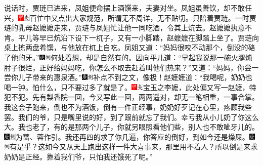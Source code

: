 {{{{{说话时，贾琏已进来，凤姐便命摆上酒馔来，夫妻对坐。凤姐虽善饮，却不敢任兴，{\includegraphics[width=3mm]{../Images/00002}\includegraphics[width=3mm]{../Images/00012}\footnotesize \kaishu 百忙中又点出大家规范，所谓无不周详，无不贴切。}只陪着贾琏。一时贾琏的乳母赵嬷嬷走来，贾琏与凤姐忙让他一同吃酒，令其上炕去。赵嬷嬷执意不肯。平儿等早已炕沿下设下一杌子，又有一小脚踏，赵嬷嬷在脚踏上坐了。贾琏向桌上拣两盘肴馔，与他放在杌上自吃。凤姐又道：“妈妈很咬不动那个，倒没的硌了他的牙。”{\includegraphics[width=3mm]{../Images/00004}\includegraphics[width=3mm]{../Images/00011}\footnotesize \kaishu 何处着想，却是自然有的。}因向平儿道：“早起我说那一碗火腿炖肘子很烂，正好给妈妈吃，你怎么不取去赶着叫他们热来？”又道：“妈妈，你尝一尝你儿子带来的惠泉酒。”{\includegraphics[width=3mm]{../Images/00004}\includegraphics[width=3mm]{../Images/00011}\footnotesize \kaishu 补点不到之文，像极！}赵嬷嬷道：“我喝呢，奶奶也喝一钟。怕什么，只不要过多了就是了。{\includegraphics[width=3mm]{../Images/00002}\includegraphics[width=3mm]{../Images/00012}\footnotesize \kaishu 宝玉之李嬷，此处偏又写一赵嬷，特犯不犯。先有梨香院一回，今又写此一回，两两遥对，却无一笔相重，一事合掌。}我这会子跑来，倒也不为酒饭，倒有一件正经事，奶奶好歹记在心里，疼顾我些罢。我们的爷，只是嘴里说的好，到了跟前就忘了我们。幸亏我从小儿奶了你这么大。我也老了，有的是那两个儿子，你就另眼照看他们些，别人也不敢呲牙儿的。{\includegraphics[width=3mm]{../Images/00004}\includegraphics[width=3mm]{../Images/00011}\footnotesize \kaishu 为蔷、蓉作引。}我还再四的求了你几遍，你答应的倒好，到如今还是燥屎。{\includegraphics[width=3mm]{../Images/00004}\includegraphics[width=3mm]{../Images/00011}\footnotesize \kaishu 有是乎？}这如今又从天上跑出这样一件大喜事来，那里用不着人？所以倒是来求奶奶是正经。靠着我们爷，只怕我还饿死了呢。”

}}}}}
